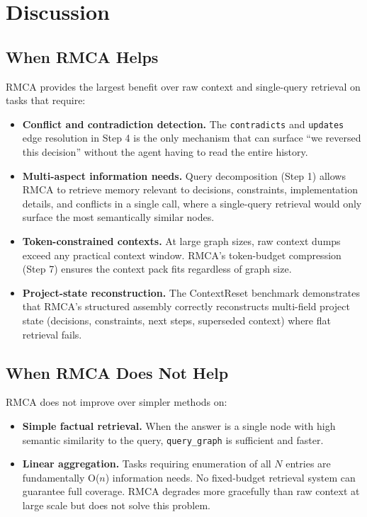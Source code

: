 \documentclass[conference]{IEEEtran}
\begin{document}
\section{Discussion}

\subsection{When RMCA Helps}

RMCA provides the largest benefit over raw context and single-query retrieval on tasks
that require:
\begin{itemize}
\item \textbf{Conflict and contradiction detection.} The \texttt{contradicts} and
\texttt{updates} edge resolution in Step 4 is the only mechanism that can surface
``we reversed this decision'' without the agent having to read the entire history.
\item \textbf{Multi-aspect information needs.} Query decomposition (Step 1) allows RMCA
to retrieve memory relevant to decisions, constraints, implementation details, and conflicts
in a single call, where a single-query retrieval would only surface the most semantically
similar nodes.
\item \textbf{Token-constrained contexts.} At large graph sizes, raw context dumps exceed
any practical context window. RMCA's token-budget compression (Step 7) ensures the context
pack fits regardless of graph size.
\item \textbf{Project-state reconstruction.} The ContextReset benchmark demonstrates that
RMCA's structured assembly correctly reconstructs multi-field project state (decisions,
constraints, next steps, superseded context) where flat retrieval fails.
\end{itemize}

\subsection{When RMCA Does Not Help}

RMCA does not improve over simpler methods on:
\begin{itemize}
\item \textbf{Simple factual retrieval.} When the answer is a single node with high
semantic similarity to the query, \texttt{query\_graph} is sufficient and faster.
\item \textbf{Linear aggregation.} Tasks requiring enumeration of all $N$ entries are
fundamentally O($n$) information needs. No fixed-budget retrieval system can guarantee
full coverage. RMCA degrades more gracefully than raw context at large scale but does not
solve this problem.
\end{itemize}
\end{document}
